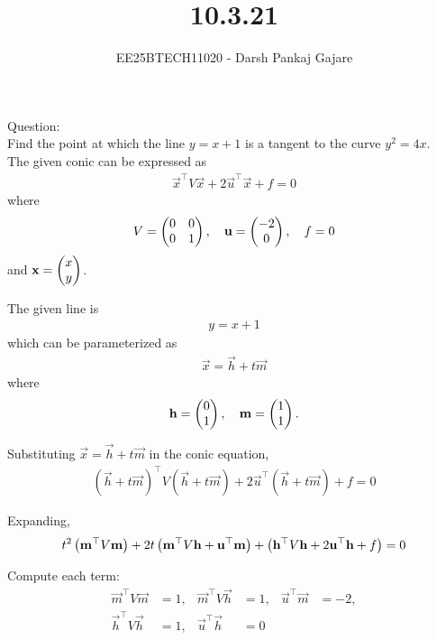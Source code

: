 \documentclass{beamer}
\let\solution\relax
\numberwithin{equation}{section}
\begin{document}
\title{10.3.21}
\author{EE25BTECH11020 - Darsh Pankaj Gajare}
{\let\newpage\relax\maketitle}


Question:\\
Find the point at which the line $y=x+1$ is a tangent to the curve $y^2=4x$.\\
\solution
The given conic can be expressed as
\begin{align}
\vec{x}^\top V\vec{x} + 2\vec{u}^\top\vec{x} + f = 0
\end{align}
where
\begin{align}
V = \begin{pmatrix}0 & 0 \\ 0 & 1\end{pmatrix}, \quad
\mathbf{u} = \begin{pmatrix}-2 \\ 0\end{pmatrix}, \quad
f = 0
\end{align}
and $\mathbf{x} = \begin{pmatrix}x \\ y\end{pmatrix}$.

The given line is 
\begin{align}
y = x + 1
\end{align}
which can be parameterized as
\begin{align}
\vec{x} = \vec{h} + t\vec{m}
\end{align}
where
\begin{align}
\mathbf{h} = \begin{pmatrix}0 \\ 1\end{pmatrix}, \quad
\mathbf{m} = \begin{pmatrix}1 \\ 1\end{pmatrix}.
\end{align}

Substituting $\vec{x} = \vec{h} + t\vec{m}$ in the conic equation,
\begin{align}
(\vec{h} + t\vec{m})^\top V (\vec{h} + t\vec{m})
+ 2\vec{u}^\top (\vec{h} + t\vec{m}) + f = 0
\end{align}

Expanding,
\begin{align}
t^2\left(\mathbf{m}^\top V\mathbf{m}\right) 
+ 2t\left(\mathbf{m}^\top V\mathbf{h} + \mathbf{u}^\top\mathbf{m}\right) 
+ \left(\mathbf{h}^\top V\mathbf{h} + 2\mathbf{u}^\top\mathbf{h} + f\right) = 0
\end{align}

Compute each term:
\begin{align}
\vec{m}^\top V\vec{m} &= 1, &
\vec{m}^\top V\vec{h} &= 1, &
\vec{u}^\top\vec{m} &= -2, \\
\vec{h}^\top V\vec{h} &= 1, &
\vec{u}^\top\vec{h} &= 0
\end{align}
\end{document}
